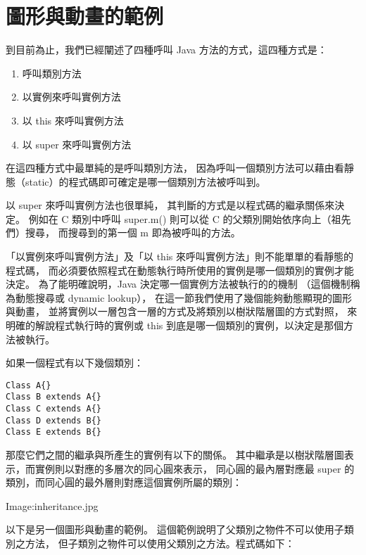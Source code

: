 \documentclass[a4paper,12pt,english]{sphinxmanual}
\begin{document}
\section{圖形與動畫的範例}
\label{java_abstract:id6}
到目前為止，我們已經闡述了四種呼叫 Java 方法的方式，這四種方式是：
\begin{enumerate}
\item {} 
呼叫類別方法

\item {} 
以實例來呼叫實例方法

\item {} 
以 this 來呼叫實例方法

\item {} 
以 super 來呼叫實例方法

\end{enumerate}

在這四種方式中最單純的是呼叫類別方法，
因為呼叫一個類別方法可以藉由看靜態（static）的程式碼即可確定是哪一個類別方法被呼叫到。

以 super 來呼叫實例方法也很單純，
其判斷的方式是以程式碼的繼承關係來決定。
例如在 C 類別中呼叫 super.m() 則可以從 C 的父類別開始依序向上（祖先們）搜尋，
而搜尋到的第一個 m 即為被呼叫的方法。

「以實例來呼叫實例方法」及「以 this 來呼叫實例方法」則不能單單的看靜態的程式碼，
而必須要依照程式在動態執行時所使用的實例是哪一個類別的實例才能決定。
為了能明確說明，Java 決定哪一個實例方法被執行的的機制
（這個機制稱為動態搜尋或 dynamic lookup），
在這一節我們使用了幾個能夠動態顯現的圖形與動畫，
並將實例以一層包含一層的方式及將類別以樹狀階層圖的方式對照，
來明確的解說程式執行時的實例或 this 到底是哪一個類別的實例，以決定是那個方法被執行。

如果一個程式有以下幾個類別：

\begin{Verbatim}[commandchars=@\[\]]
Class A{}
Class B extends A{}
Class C extends A{}
Class D extends B{}
Class E extends B{}
\end{Verbatim}

那麼它們之間的繼承與所產生的實例有以下的關係。
其中繼承是以樹狀階層圖表示，而實例則以對應的多層次的同心圓來表示，
同心圓的最內層對應最 super 的類別，而同心圓的最外層則對應這個實例所屬的類別：

Image:inheritance.jpg

以下是另一個圖形與動畫的範例。
這個範例說明了父類別之物件不可以使用子類別之方法，
但子類別之物件可以使用父類別之方法。程式碼如下：
\end{document}
